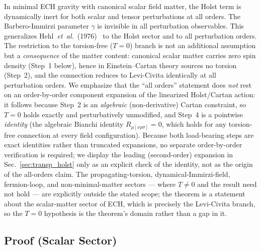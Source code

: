 \documentclass[aps,prd,twocolumn,superscriptaddress,showpacs,preprintnumbers,nofootinbib,longbibliography,floatfix]{revtex4-2}
\newcommand{\etal}{\textit{et~al.}}
\begin{document}
In minimal ECH gravity with canonical scalar field matter, the Holst term is
dynamically inert for both scalar and tensor perturbations at all orders. The
Barbero-Immirzi parameter $\gamma$ is invisible in all perturbation observables.
This generalizes Hehl~\etal~(1976)~\cite{Hehl1976} to the Holst sector and to
all perturbation orders. The restriction to the torsion-free ($T=0$) branch is
not an additional assumption but a \emph{consequence} of the matter content:
canonical scalar matter carries zero spin density (Step~1 below), hence in
Einstein--Cartan theory sources no torsion (Step~2), and the connection reduces
to Levi-Civita identically at all perturbation orders. We emphasize that the
``all orders'' statement does \emph{not} rest on an order-by-order component
expansion of the linearized Holst/Cartan action: it follows because Step~2 is
an \emph{algebraic} (non-derivative) Cartan constraint, so $T=0$ holds
exactly and perturbatively unmodified, and Step~4 is a pointwise
\emph{identity} (the algebraic Bianchi identity $R_{\mu[\nu\rho\sigma]}=0$,
which holds for any torsion-free connection at every field configuration).
Because both load-bearing steps are exact identities rather than truncated
expansions, no separate order-by-order verification is required; we display
the leading (second-order) expansion in Sec.~\ref{sec:transp_holst} only as an
explicit check of the identity, not as the origin of the all-orders claim. The propagating-torsion,
dynamical-Immirzi-field, fermion-loop, and non-minimal-matter sectors --- where
$T\neq0$ and the result need not hold --- are explicitly outside the stated
scope; the theorem is a statement about the scalar-matter sector of ECH, which
is precisely the Levi-Civita branch, so the $T=0$ hypothesis is the theorem's
domain rather than a gap in it.

\subsection{Proof (Scalar Sector)}\label{sec:transp_proof}
\end{document}
